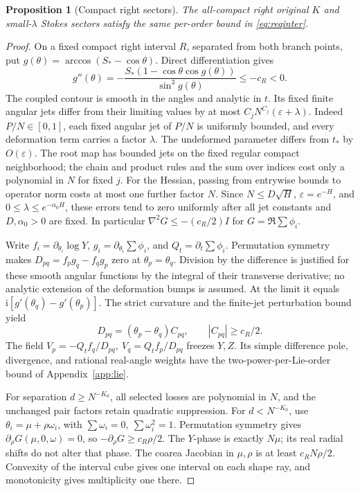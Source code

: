\documentclass[11pt]{article}
\numberwithin{equation}{section}
\newtheorem{proposition}[theorem]{Proposition}
\theoremstyle{definition}
\newcommand{\ii}{\mathrm i}
\newcommand{\eps}{\varepsilon}
\begin{document}
\begin{proposition}[Compact right sectors]\label{prop:compactR}
The all-compact right original \(K\) and small-\(\lambda\) Stokes
sectors satisfy the same per-order bound in \eqref{eq:reqinter}.
\end{proposition}
\begin{proof}
On a fixed compact right interval \(R\), separated from both branch
points, put \(g(\theta)=\arccos(S_*-\cos\theta)\). Direct differentiation
gives
\[
 g''(\theta)=-\frac{S_*(1-\cos\theta\cos g(\theta))}{\sin^3g(\theta)}
            \le-c_R<0 .
\]
The coupled contour is smooth in the angles and analytic in \(t\).
Its fixed finite angular jets differ from their limiting values by at most
\(C_jN^{C_j}(\eps+\lambda)\). Indeed \(P/N\in[0,1]\), each
fixed angular jet of \(P/N\) is uniformly bounded, and every
deformation term carries a factor \(\lambda\). The undeformed
parameter differs from \(t_*\) by \(O(\eps)\). The root map has
bounded jets on the fixed regular compact neighborhood; the chain
and product rules and the sum over indices cost only a polynomial
in \(N\) for fixed \(j\). For the Hessian, passing from entrywise
bounds to operator norm costs at most one further factor \(N\).
Since \(N\le D\sqrt H\), \(\eps=e^{-H}\), and
\(0\le\lambda\le e^{-\alpha_0H}\), these errors tend to zero
uniformly after all jet constants and \(D,\alpha_0>0\) are fixed.
In particular
\(\nabla^2 G\le-(c_R/2)I\) for \(G=\Re\sum\phi_i\).

Write \(f_i=\partial_{\theta_i}\log Y\), \(g_i=\partial_{\theta_i}\sum\phi_i\),
and \(Q_t=\partial_t\sum\phi_i\). Permutation symmetry makes
\(D_{pq}=f_pg_q-f_qg_p\) zero at \(\theta_p=\theta_q\).
Division by the difference is justified for these smooth angular
functions by the integral of their transverse derivative; no analytic
extension of the deformation bumps is assumed.
At the limit it equals \(\ii[g'(\theta_q)-g'(\theta_p)]\).
The strict curvature and the finite-jet perturbation bound yield
\[
 D_{pq}=(\theta_p-\theta_q)C_{pq},\qquad |C_{pq}|\ge c_R/2 .
\]
The field
\(V_p=-Q_tf_q/D_{pq},\ V_q=Q_tf_p/D_{pq}\)
freezes \(Y,Z\). Its simple difference pole, divergence, and
rational real-angle weights have the two-power-per-Lie-order
bound of Appendix~\ref{app:lie}.

For separation \(d\ge N^{-K_0}\), all selected losses are polynomial
in \(N\), and the unchanged pair factors retain quadratic suppression.
For \(d<N^{-K_0}\), use \(\theta_i=\mu+\rho\omega_i\), with
\(\sum\omega_i=0,\ \sum\omega_i^2=1\).
Permutation symmetry gives \(\partial_\rho G(\mu,0,\omega)=0\),
so \(-\partial_\rho G\ge c_R\rho/2\).
The \(Y\)-phase is exactly \(N\mu\); its real radial shifts do not
alter that phase. The coarea Jacobian in \(\mu,\rho\) is at least
\(c_RN\rho/2\). Convexity of the interval cube gives one interval
on each shape ray, and monotonicity gives multiplicity one there.


\end{proof}
\end{document}

